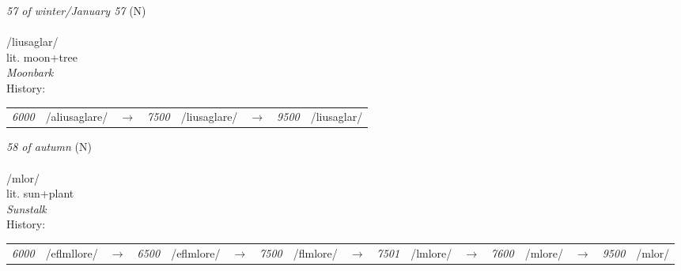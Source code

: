 \vspace{15pt}
\begin{nopagebreak}
 \textit{57 of winter/January 57} (N)\\
\\
\noindent /lius{\textprimstress}aglar/\\
\noindent lit. moon+tree\\
\noindent \textit{Moonbark}\\


\noindent History:

\vspace{-0pt}
\hspace{40pt}
\begin{tabular}{ccc}
\textit{6000} & /aliusaglare/&$\rightarrow$ & \textit{7500} & /liusaglare/&$\rightarrow$ & \textit{9500} & /liusaglar/& \\
\end{tabular}

\vspace{20pt}\hline

\end{nopagebreak}
\filbreak



\vspace{15pt}
\begin{nopagebreak}
 \textit{58 of autumn} (N)\\
\\
\noindent /ml{\textprimstress}or/\\
\noindent lit. sun+plant\\
\noindent \textit{Sunstalk}\\


\noindent History:

\vspace{-0pt}
\hspace{40pt}
\begin{tabular}{ccc}
\textit{6000} & /eflmllore/&$\rightarrow$ & \textit{6500} & /eflmlore/&$\rightarrow$ & \textit{7500} & /flmlore/&$\rightarrow$ & \textit{7501} & /lmlore/&$\rightarrow$ & \textit{7600} & /mlore/&$\rightarrow$ & \textit{9500} & /mlor/& \\
\end{tabular}

\vspace{20pt}\hline

\end{nopagebreak}
\filbreak



